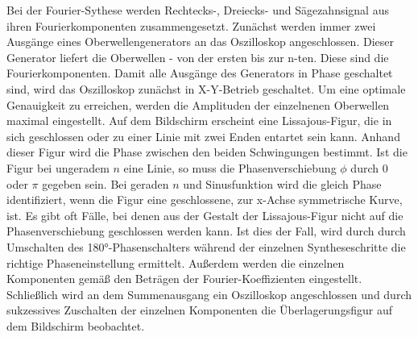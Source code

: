 Bei der Fourier-Sythese werden Rechtecks-, Dreiecks- und Sägezahnsignal 
aus ihren Fourierkomponenten zusammengesetzt. 
Zunächst werden immer zwei Ausgänge eines Oberwellengenerators an das 
Oszilloskop angeschlossen. Dieser Generator liefert die Oberwellen - von der ersten bis zur n-ten.
Diese sind die Fourierkomponenten. Damit alle Ausgänge 
des Generators in Phase geschaltet sind, wird das Oszilloskop zunächst 
in X-Y-Betrieb geschaltet.
Um eine optimale Genauigkeit zu erreichen, werden die Amplituden der
einzelnenen Oberwellen maximal eingestellt. 
Auf dem Bildschirm erscheint eine Lissajous-Figur, die in sich geschlossen 
oder zu einer Linie mit zwei Enden entartet sein kann. Anhand dieser 
Figur wird die Phase zwischen den beiden Schwingungen bestimmt. Ist die
Figur bei ungeradem $n$ eine Linie, so muss die Phasenverschiebung $\phi$ 
durch 0 oder $\pi$ gegeben sein. Bei geraden $n$ und Sinusfunktion wird
die gleich Phase identifiziert, wenn die Figur eine geschlossene, zur 
x-Achse symmetrische Kurve, ist. Es gibt oft Fälle, bei denen aus der
Gestalt der Lissajous-Figur nicht auf die Phasenverschiebung geschlossen 
werden kann. Ist dies der Fall, wird durch durch Umschalten des 180°-Phasenschalters
während der einzelnen Syntheseschritte die richtige Phaseneinstellung ermittelt. 
Außerdem werden die einzelnen Komponenten gemäß den Beträgen der Fourier-Koeffizienten
eingestellt. Schließlich wird an dem Summenausgang ein Oszilloskop 
angeschlossen und durch sukzessives Zuschalten der einzelnen Komponenten 
die Überlagerungsfigur auf dem Bildschirm beobachtet. 